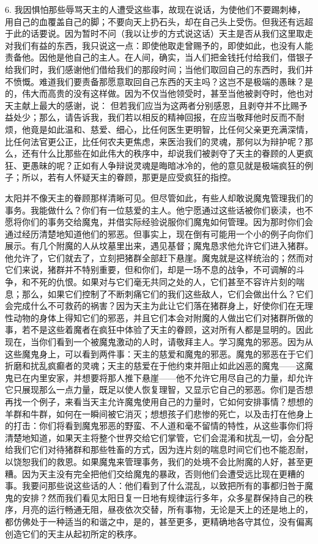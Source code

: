 6. 我因惧怕那些辱骂天主的人遭受这些事，故现在说话，为使他们不要踢刺棒，用自己的血覆盖自己的脚；不要向天上扔石头，却在自己头上受伤。但我还有远超于此的话要说。因为暂时不问（我以让步的方式说这话）天主是否从我们这里取走对我们有益的东西，我只说这一点：即使他取走曾赐予的，即使如此，也没有人能责备他。因他是他自己的主人。在人间，确实，当人们把金钱托付给我们，借银子给我们时，我们感谢他们借给我们的那段时间；当他们取回自己的东西时，我们并不愤慨。难道我们要责备那愿意取回自己东西的天主吗？这岂不是极端的愚昧？是的，伟大而高贵的没有这样做。因为不仅当他领受时，甚至当他被剥夺时，他也对天主献上最大的感谢，说： 但若我们应当为这两者分别感恩，且剥夺并不比赐予益处少；那么，请告诉我，我们若以相反的精神回报，在应当敬拜他时反而不耐烦，他竟是如此温和、慈爱、细心，比任何医生更明智，比任何父亲更充满深情，比任何法官更公正，比任何农夫更焦虑，来医治我们的灵魂，那何以为辩护呢？那么，还有什么比那些在如此伟大的秩序中，却说我们被剥夺了天主的眷顾的人更疯狂、更愚昧的呢？正如有人争辩说灵魂是晦暗冰冷的，他的意见就是极端疯狂的例子；所以，若有人怀疑天主的眷顾，那更是应受疯狂的指控。\par

太阳并不像天主的眷顾那样清晰可见。但尽管如此，有些人却敢说魔鬼管理我们的事务。我能做什么？你们有一位慈爱的主人。他宁愿通过这些话被你们亵渎，也不愿将你们的事务交给魔鬼，并借实际经验说服你们魔鬼如何管理。因为那时你们会通过经历清楚地知道他们的邪恶。但事实上，现在倒有可能用一个小的例子向你们展示。有几个附魔的人从坟墓里出来，遇见基督；魔鬼恳求他允许它们进入猪群。他允许了，它们就去了，立刻把猪群全部赶下悬崖。魔鬼就是这样统治的；然而对它们来说，猪群并不特别重要，但和你们，却是一场不息的战争，不可调解的斗争，和不死的仇恨。如果对与它们毫无共同之处的人，它们甚至不容许片刻的喘息；那么，如果它们控制了不断刺痛它们的我们这些敌人，它们会做出什么？它们会完成什么不可救药的祸害？因为天主为此让它们落在猪群身上，好使你们在无理性动物的身体上得知它们的邪恶，并且它们本会对附魔的人做出它们对猪群所做的事，若不是这些着魔者在疯狂中体验了天主的眷顾，这对所有人都是显明的。因此现在，当你们看到一个被魔鬼激动的人时，请敬拜主人。学习魔鬼的邪恶。因为从这些魔鬼身上，可以看到两件事：天主的慈爱和魔鬼的邪恶。魔鬼的邪恶在于它们折磨和扰乱疯癫者的灵魂；天主的慈爱在于他约束并阻止如此凶恶的魔鬼——这魔鬼已在内里安家，并想要将那人推下悬崖——他不允许它用尽自己的力量，却允许它只展现那么一点力量，既足以使人恢复理智，又显示它自己的邪恶。你们是否想再找一个例子，来看当天主允许魔鬼使用自己的力量时，它如何安排事情？想想的羊群和牛群，如何在一瞬间被它消灭；想想孩子们悲惨的死亡，以及击打在他身上的打击：你们将看到魔鬼邪恶的野蛮、不人道和毫不留情的特性，从这些事你们将清楚地知道，如果天主将整个世界交给它们掌管，它们会混淆和扰乱一切，会分配给我们它们对待猪群和那些牲畜的方式，因为连片刻的喘息时间它们也不能忍耐，以饶恕我们的救恩。如果魔鬼来管理事务，我们的处境不会比附魔的人好，甚至更糟。因为天主没有完全把他们交给魔鬼的暴政，否则他们会遭受远比现在更糟的事。我要问那些说这些话的人：他们看到了什么混乱，以致把所有的事都归咎于魔鬼的安排？然而我们看见太阳日复一日地有规律运行多年，众多星群保持自己的秩序，月亮的运行畅通无阻，昼夜依次交替，所有事物，无论是天上的还是地上的，都仿佛处于一种适当的和谐之中，是的，甚至更多，更精确地各守其位，没有偏离创造它们的天主从起初所定的秩序。\par

